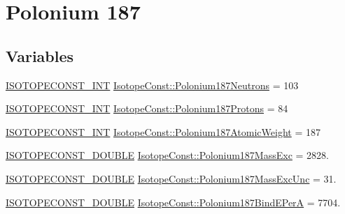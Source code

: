 \hypertarget{group___isotope_const-_polonium-_po187}{}\section{Polonium 187}
\label{group___isotope_const-_polonium-_po187}
\subsection*{Variables}
\begin{DoxyCompactItemize}
\item 
\mbox{\hyperlink{group___isotope_const-_macros_ga5f18360b3e99483a35c32d789e62621c}{I\+S\+O\+T\+O\+P\+E\+C\+O\+N\+S\+T\+\_\+\+I\+NT}} \mbox{\hyperlink{group___isotope_const-_polonium-_po187_gaa0d74c81b86a56fd993395dfdd2bc192}{Isotope\+Const\+::\+Polonium187\+Neutrons}} = 103
\item 
\mbox{\hyperlink{group___isotope_const-_macros_ga5f18360b3e99483a35c32d789e62621c}{I\+S\+O\+T\+O\+P\+E\+C\+O\+N\+S\+T\+\_\+\+I\+NT}} \mbox{\hyperlink{group___isotope_const-_polonium-_po187_ga9eb452b99b37a0f4e46446e99a27e94a}{Isotope\+Const\+::\+Polonium187\+Protons}} = 84
\item 
\mbox{\hyperlink{group___isotope_const-_macros_ga5f18360b3e99483a35c32d789e62621c}{I\+S\+O\+T\+O\+P\+E\+C\+O\+N\+S\+T\+\_\+\+I\+NT}} \mbox{\hyperlink{group___isotope_const-_polonium-_po187_gaa973b924277280133bff9de9d4cb3b74}{Isotope\+Const\+::\+Polonium187\+Atomic\+Weight}} = 187
\item 
\mbox{\hyperlink{group___isotope_const-_macros_ga8f45a7272ce02c0b4c65c44636ed719a}{I\+S\+O\+T\+O\+P\+E\+C\+O\+N\+S\+T\+\_\+\+D\+O\+U\+B\+LE}} \mbox{\hyperlink{group___isotope_const-_polonium-_po187_ga10f69cef83d06cd4bea214cc7f3008cd}{Isotope\+Const\+::\+Polonium187\+Mass\+Exc}} = 2828.
\item 
\mbox{\hyperlink{group___isotope_const-_macros_ga8f45a7272ce02c0b4c65c44636ed719a}{I\+S\+O\+T\+O\+P\+E\+C\+O\+N\+S\+T\+\_\+\+D\+O\+U\+B\+LE}} \mbox{\hyperlink{group___isotope_const-_polonium-_po187_ga6bb04c2dffa986ab2520fb22fd162505}{Isotope\+Const\+::\+Polonium187\+Mass\+Exc\+Unc}} = 31.
\item 
\mbox{\hyperlink{group___isotope_const-_macros_ga8f45a7272ce02c0b4c65c44636ed719a}{I\+S\+O\+T\+O\+P\+E\+C\+O\+N\+S\+T\+\_\+\+D\+O\+U\+B\+LE}} \mbox{\hyperlink{group___isotope_const-_polonium-_po187_gae97e602bee6be5bdfe50f4df845a83ce}{Isotope\+Const\+::\+Polonium187\+Bind\+E\+PerA}} = 7704.
\item 

\end{DoxyCompactItemize}
